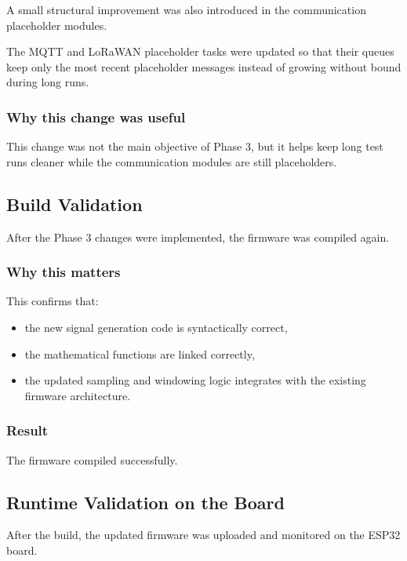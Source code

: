 \documentclass[12pt,a4paper]{article}
\begin{document}
A small structural improvement was also introduced in the communication
placeholder modules.

The MQTT and LoRaWAN placeholder tasks were updated so that their queues keep
only the most recent placeholder messages instead of growing without bound
during long runs.

\subsubsection*{Why this change was useful}

This change was not the main objective of Phase 3, but it helps keep long test
runs cleaner while the communication modules are still placeholders.

\subsection{Build Validation}

After the Phase 3 changes were implemented, the firmware was compiled again.

\subsubsection*{Why this matters}

This confirms that:

\begin{itemize}
    \item the new signal generation code is syntactically correct,
    \item the mathematical functions are linked correctly,
    \item the updated sampling and windowing logic integrates with the existing
    firmware architecture.
\end{itemize}

\subsubsection*{Result}

The firmware compiled successfully.

\subsection{Runtime Validation on the Board}

After the build, the updated firmware was uploaded and monitored on the ESP32
board.
\end{document}
